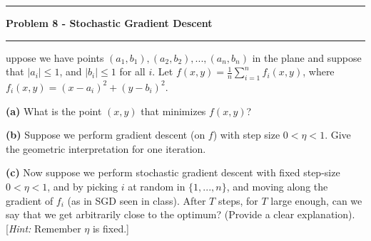 \documentclass[11pt]{article}
\newcommand\question[2]{\vspace{.25in}\hrule\textbf{#1}\vspace{.5em}\hrule\vspace{.10in}}
\renewcommand\part[1]{\vspace{.10in}\textbf{(#1)}}
\begin{document}
\question{Problem 8 - Stochastic Gradient Descent}

Suppose we have points $(a_1, b_1), (a_2, b_2), ... , (a_n, b_n)$ in the plane and suppose that $\vert a_i \vert \leq 1$, and $\vert b_i \vert \leq 1$ for all $i$. Let $f(x, y) = \frac{1}{n} \sum_{i = 1}^n f_i(x, y)$, where $f_i(x, y) = (x - a_i)^2 + (y - b_i)^2$.

\part{a} What is the point $(x , y)$ that minimizes $f(x, y)$?


\part{b} Suppose we perform gradient descent (on $f$) with step size $0 < \eta < 1$. Give the geometric interpretation for one iteration.


\part{c} Now suppose we perform stochastic gradient descent with fixed step-size $0 < \eta < 1$, and by picking $i$ at random in $\{1, ... , n\}$, and moving along the gradient of $f_i$ (as in SGD seen in class). After $T$ steps, for $T$ large enough, can we say that we get arbitrarily close to the optimum? (Provide a clear explanation). [\textit{Hint:} Remember $\eta$ is fixed.]
\end{document}
